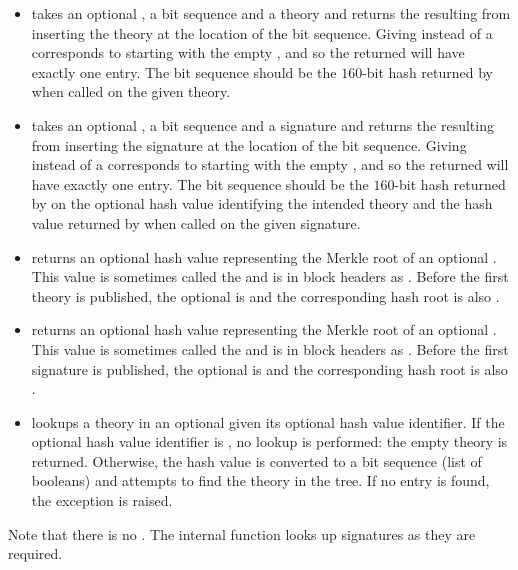 \begin{itemize}
\item {} takes an optional {}, a bit sequence and a theory
      and returns the {} resulting from inserting the theory at the location of the bit sequence.
      Giving {} instead of a {} corresponds to starting with the empty {},
      and so the returned {} will have exactly one entry.
      The bit sequence should be the $160$-bit hash returned by {} when called on the given theory.
\item {} takes an optional {}, a bit sequence and a signature
      and returns the {} resulting from inserting the signature at the location of the bit sequence.
      Giving {} instead of a {} corresponds to starting with the empty {},
      and so the returned {} will have exactly one entry.
      The bit sequence should be the $160$-bit hash returned by 
      {} on the optional hash value identifying the intended theory
      and the hash value returned by {} when called on the given signature.
\item {} returns an optional hash value representing the Merkle root
      of an optional {}.
      This value is sometimes called the {} and is in block headers
      as {}.
      Before the first theory is published, the optional {} is {}
      and the corresponding hash root is also {}.
\item {} returns an optional hash value representing the Merkle root
      of an optional {}.
      This value is sometimes called the {} and is in block headers
      as {}.
      Before the first signature is published, the optional {} is {}
      and the corresponding hash root is also {}.
\item {} lookups a theory in an optional {} given its optional hash value
      identifier.
      If the optional hash value identifier is {}, no lookup is performed: the empty theory is returned.
      Otherwise, the hash value is converted to a bit sequence (list of booleans) and
      {} attempts to find the theory in the tree.
      If no entry is found, the exception {} is raised.
\end{itemize}
Note that there is no {}.
The internal function {} looks up signatures
as they are required.

